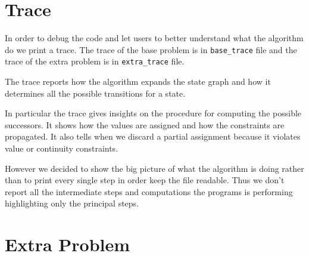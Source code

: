 \documentclass[a4paper]{article}
\begin{document}
\section{Trace}
In order to debug the code and let users to better understand what the algorithm do we print a trace. The trace of the base problem is in \texttt{base\_trace} file and the trace of the extra problem is in \texttt{extra\_trace} file.

The trace reports how the algorithm expands the state graph and how it determines all the possible transitions for a state.

In particular the trace gives insights on the procedure for computing the possible successors. It shows how the values are assigned and how the constraints are propagated. It also tells when we discard a partial assignment because it violates value or continuity constraints.   

However we decided to show the big picture of what the algorithm is doing rather than to print every single step in order keep the file readable. Thus we don't report all the intermediate steps and computations the programs is performing highlighting only the principal steps.

\section{Extra Problem}
\end{document}
